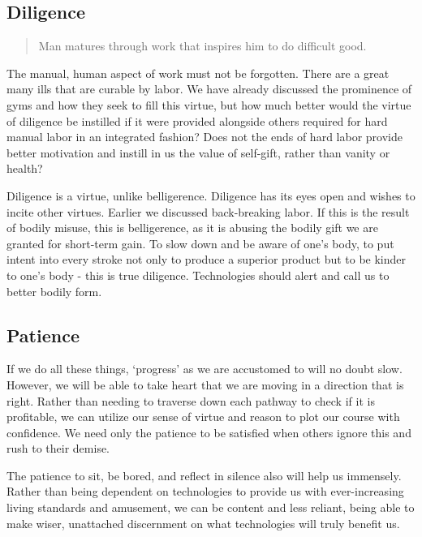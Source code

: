 \documentclass[letterpaper]{article}
\begin{document}


\subsection{Diligence}

\begin{quote}
  Man matures through work that inspires him to do difficult good.
\end{quote}

The manual, human aspect of work must not be forgotten. There are a great many ills that are curable by labor. We have already discussed the prominence of gyms and how they seek to fill this virtue, but how much better would the virtue of diligence be instilled if it were provided alongside others required for hard manual labor in an integrated fashion? Does not the ends of hard labor provide better motivation and instill in us the value of self-gift, rather than vanity or health?

Diligence is a virtue, unlike belligerence. Diligence has its eyes open and wishes to incite other virtues. Earlier we discussed back-breaking labor. If this is the result of bodily misuse, this is belligerence, as it is abusing the bodily gift we are granted for short-term gain. To slow down and be aware of one's body, to put intent into every stroke not only to produce a superior product but to be kinder to one's body - this is true diligence. Technologies should alert and call us to better bodily form.

\subsection{Patience}

If we do all these things, `progress' as we are accustomed to will no doubt slow. However, we will be able to take heart that we are moving in a direction that is right. Rather than needing to traverse down each pathway to check if it is profitable, we can utilize our sense of virtue and reason to plot our course with confidence. We need only the patience to be satisfied when others ignore this and rush to their demise.

The patience to sit, be bored, and reflect in silence also will help us immensely. Rather than being dependent on technologies to provide us with ever-increasing living standards and amusement, we can be content and less reliant, being able to make wiser, unattached discernment on what technologies will truly benefit us.
\end{document}
